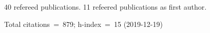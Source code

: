 40 refereed publications. 11 refeered publications as first author.

Total citations~=~879; h-index~=~15 (2019-12-19)